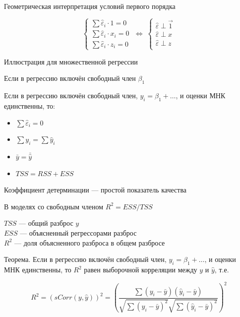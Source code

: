 \documentclass[ignorenonframetext,]{beamer}
\begin{document}
\begin{frame}{Геометрическая интерпретация условий первого порядка}

\[
\begin{cases}
\sum \hat{\varepsilon}_i \cdot 1 =0 \\
\sum \hat{\varepsilon}_i \cdot x_i =0 \\
\sum \hat{\varepsilon}_i \cdot z_i =0
\end{cases}\; \Leftrightarrow \;
\begin{cases}
\hat{\varepsilon}\perp \vec{1} \\
\hat{\varepsilon}\perp x \\
\hat{\varepsilon}\perp z \\
\end{cases}
\]

\end{frame}

\begin{frame}{Иллюстрация для множественной регрессии}

\end{frame}

\begin{frame}{Если в регрессию включён свободный член \(\beta_1\)}

Если в регрессию включён свободный член, \(y_i=\beta_1 + \ldots\), и
оценки МНК единственны, то:

\begin{itemize}
\itemsep1pt\parskip0pt
\item
  \(\sum \hat{\varepsilon}_i=0\)\\
\item
  \(\sum y_i = \sum \hat{y}_i\)\\
\item
  \(\bar{y}=\bar{\hat{y}}\)\\
\item
  \(TSS=RSS+ESS\)
\end{itemize}

\end{frame}

\begin{frame}{Коэффициент детерминации --- простой показатель качества}

В моделях со свободным членом \(R^2=ESS/TSS\)

\(TSS\) --- общий разброс \(y\)\\\(ESS\) --- объясненный регрессорами
разброс\\\(R^2\) --- доля объясненного разброса в общем разбросе

Теорема. Если в регрессию включён свободный член,
\(y_i=\beta_1 + \ldots\), и оценки МНК единственны, то \(R^2\) равен
выборочной корреляции между \(y\) и \(\hat{y}\), т.е.

\[
R^2=(sCorr(y,\hat{y}))^2=\left(\frac{\sum (y_i-\bar{y})(\hat{y}_i-\bar{y})}{\sqrt{\sum(y_i-\bar{y})^2}\sqrt{\sum(\hat{y}_i-\bar{y})^2}}\right)^2
\]

\end{frame}
\end{document}
